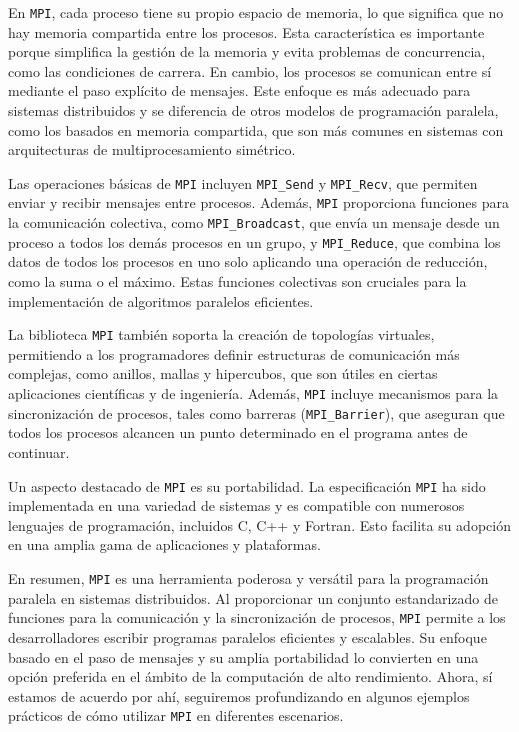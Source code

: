 En \texttt{MPI}, cada proceso tiene su propio espacio de memoria, lo que significa que no hay memoria compartida entre los procesos. Esta característica es importante porque simplifica la gestión de la memoria y evita problemas de concurrencia, como las condiciones de carrera. En cambio, los procesos se comunican entre sí mediante el paso explícito de mensajes. Este enfoque es más adecuado para sistemas distribuidos y se diferencia de otros modelos de programación paralela, como los basados en memoria compartida, que son más comunes en sistemas con arquitecturas de multiprocesamiento simétrico.

Las operaciones básicas de \texttt{MPI} incluyen \texttt{MPI\_Send} y \texttt{MPI\_Recv}, que permiten enviar y recibir mensajes entre procesos. Además, \texttt{MPI} proporciona funciones para la comunicación colectiva, como \texttt{MPI\_Broadcast}, que envía un mensaje desde un proceso a todos los demás procesos en un grupo, y \texttt{MPI\_Reduce}, que combina los datos de todos los procesos en uno solo aplicando una operación de reducción, como la suma o el máximo. Estas funciones colectivas son cruciales para la implementación de algoritmos paralelos eficientes.\cite{barney-llnl-mpi-tutorial-no-date}

La biblioteca \texttt{MPI} también soporta la creación de topologías virtuales, permitiendo a los programadores definir estructuras de comunicación más complejas, como anillos, mallas y hipercubos, que son útiles en ciertas aplicaciones científicas y de ingeniería. Además, \texttt{MPI} incluye mecanismos para la sincronización de procesos, tales como barreras (\texttt{MPI\_Barrier}), que aseguran que todos los procesos alcancen un punto determinado en el programa antes de continuar.\cite{anl-mpi-tutorial-no-date}

Un aspecto destacado de \texttt{MPI} es su portabilidad. La especificación \texttt{MPI} ha sido implementada en una variedad de sistemas y es compatible con numerosos lenguajes de programación, incluidos C, C++ y Fortran. Esto facilita su adopción en una amplia gama de aplicaciones y plataformas.

En resumen, \texttt{MPI} es una herramienta poderosa y versátil para la programación paralela en sistemas distribuidos. Al proporcionar un conjunto estandarizado de funciones para la comunicación y la sincronización de procesos, \texttt{MPI} permite a los desarrolladores escribir programas paralelos eficientes y escalables. Su enfoque basado en el paso de mensajes y su amplia portabilidad lo convierten en una opción preferida en el ámbito de la computación de alto rendimiento. Ahora, sí estamos de acuerdo por ahí, seguiremos profundizando en algunos ejemplos prácticos de cómo utilizar \texttt{MPI} en diferentes escenarios.

